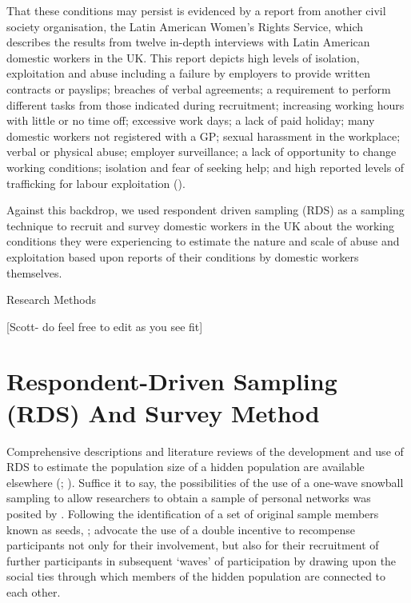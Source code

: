 \documentclass[
  12pt,
  letterpaper,
  DIV=11,
  numbers=noendperiod]{scrartcl}
\theoremstyle{plain}
\theoremstyle{definition}
\begin{document}
That these conditions may persist is evidenced by a report from another
civil society organisation, the Latin American Women's Rights Service,
which describes the results from twelve in-depth interviews with Latin
American domestic workers in the UK. This report depicts high levels of
isolation, exploitation and abuse including a failure by employers to
provide written contracts or payslips; breaches of verbal agreements; a
requirement to perform different tasks from those indicated during
recruitment; increasing working hours with little or no time off;
excessive work days; a lack of paid holiday; many domestic workers not
registered with a GP; sexual harassment in the workplace; verbal or
physical abuse; employer surveillance; a lack of opportunity to change
working conditions; isolation and fear of seeking help; and high
reported levels of trafficking for labour exploitation
(\textcite{latin_american_womens_rights_service_behind_2023}).

Against this backdrop, we used respondent driven sampling (RDS) as a
sampling technique to recruit and survey domestic workers in the UK
about the working conditions they were experiencing to estimate the
nature and scale of abuse and exploitation based upon reports of their
conditions by domestic workers themselves.

Research Methods

{[}Scott- do feel free to edit as you see fit{]}

\section{Respondent-Driven Sampling (RDS) And Survey
Method}\label{respondent-driven-sampling-rds-and-survey-method}

Comprehensive descriptions and literature reviews of the development and
use of RDS to estimate the population size of a hidden population are
available elsewhere (\textcite{heckathorn_comment_2011};
\textcite{gile_methods_2018}). Suffice it to say, the possibilities of
the use of a one-wave snowball sampling to allow researchers to obtain a
sample of personal networks was posited by
\textcite{frank_estimating_1994}. Following the identification of a set
of original sample members known as seeds,
\textcite{heckathorn_respondent-driven_1997};
\textcite{heckathorn_respondent-driven_2002} advocate the use of a
double incentive to recompense participants not only for their
involvement, but also for their recruitment of further participants in
subsequent `waves' of participation by drawing upon the social ties
through which members of the hidden population are connected to each
other.
\end{document}
